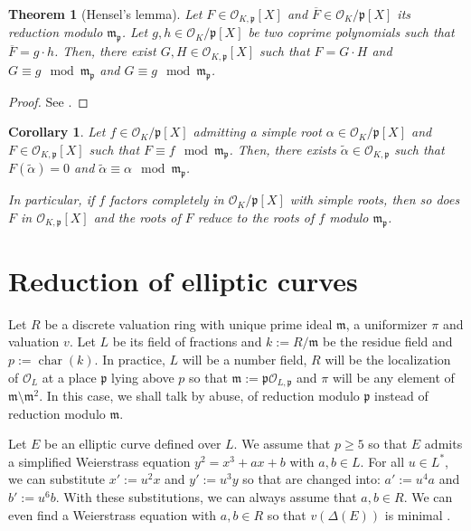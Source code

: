 \documentclass[a4paper,10pt,notitlepage]{report}
\theoremstyle{definition}
\theoremstyle{plain}
\newtheorem{Corollary}[Definition]{Corollary}
\newtheorem{Theorem}[Definition]{Theorem}
\theoremstyle{definition}
\newcommand{\mO}{\mathcal{O}}
\renewcommand{\(}{\left(}
\renewcommand{\)}{\right)}
\newcommand{\mf}[1]{\mathfrak{#1}}
\newcommand{\mfm}{\mathfrak{m}}
\newcommand{\mfp}{\mathfrak{p}}
\DeclareMathOperator{\Char}{char}%
\begin{document}
\begin{Theorem}[Hensel's lemma]\label{Theorem 9}
Let $F\in \mO_{K,\mf{p}}[X]$ and $\overline{F}\in\mO_K/\mf{p}[X]$ its reduction modulo $\mf{m}_{\mf{p}}$. Let $g,h\in \mO_K/\mf{p}[X]$ be two coprime polynomials such that $\overline{F}=g\cdot h$. Then, there exist $G,H\in \mO_{K,\mf{p}}[X]$ such that $F=G\cdot H$ and $G\equiv g \mod \mf{m}_{\mf{p}}$ and $G\equiv g \mod \mf{m}_{\mf{p}}$.
\end{Theorem}

\begin{proof}
See \cite[Lemma II.3.5]{Janusz}.
\end{proof}

\begin{Corollary}\label{Corollary 3}
Let $f\in \mO_K/\mf{p}[X]$ admitting a simple root $\alpha\in \mO_K/\mf{p}[X]$ and $F\in \mO_{K,\mf{p}}[X]$ such that $F\equiv f \mod \mf{m}_{\mf{p}}$. Then, there exists $\tilde{\alpha}\in \mO_{K,\mf{p}}$ such that $F(\tilde{\alpha})=0$ and $\tilde{\alpha}\equiv \alpha \mod \mf{m}_{\mf{p}}$. 

In particular, if $f$ factors completely in $\mO_K/\mf{p}[X]$ with simple roots, then so does $F$ in $\mO_{K,\mf{p}}[X]$ and the roots of $F$ reduce to the roots of $f$ modulo $\mf{m}_{\mf{p}}$.
\end{Corollary}

\section{Reduction of elliptic curves}\label{Pargraph 20}

Let $R$ be a discrete valuation ring with unique prime ideal $\mf{m}$,  a uniformizer $\pi$ and valuation $v$.  Let $L$ be its field of fractions and $k:=R/\mfm$ be the residue field and $p:=\Char(k)$.  In practice,  $L$ will be a number field, $R$ will be the localization of $\mO_L$ at a place $\mfp$ lying above $p$ so that $\mfm:=\mfp\mO_{L,\mfp}$ and $\pi$ will be any element of $\mfm\setminus\mfm^2$.  In this case, we shall talk by abuse, of reduction modulo $\mfp$ instead of reduction modulo $\mfm$. 

Let $E$ be an elliptic curve defined over $L$.  We assume that $p\geq 5$ so that $E$ admits a simplified Weierstrass equation $y^2=x^3+ax+b$ with $a,b\in L$.  For all $u\in L^*$,  we can substitute $x':=u^2 x$ and $y':=u^3 y$ so that are changed into: $a':=u^4a$ and  $b':=u^6b$.  With these substitutions,  we can always assume that $a, b\in R$.  We can even find a Weierstrass equation with $a, b\in R$ so that $v(\Delta(E))$ is minimal \cite[Proposition VII.1.3.(a)]{Silverman1}.  
\end{document}
